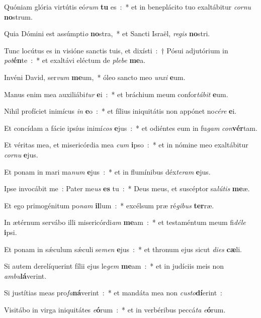 \item Quóniam glória virtútis eó\emph{rum} \textbf{tu} es~:~* et in beneplácito tuo exaltábitur \emph{cor}\emph{nu} \textbf{no}strum.
\item Quia Dómini est assúmpti\emph{o} \textbf{no}stra,~* et Sancti Israël, \emph{re}\emph{gis} \textbf{no}stri.
\item Tunc locútus es in visióne sanctis tuis, et dixísti~:~† Pósui adjutórium in \emph{pot}\textbf{én}te~:~* et exaltávi eléctum de \emph{ple}\emph{be} \textbf{me}a.
\item Invéni David, ser\emph{vum} \textbf{me}um,~* óleo sancto meo \emph{un}\emph{xi} \textbf{e}um.
\item Manus enim mea auxiliábi\emph{tur} \textbf{e}i~:~* et bráchium meum confor\emph{tá}\emph{bit} \textbf{e}um.
\item Nihil profíciet inimícus \emph{in} \textbf{e}o~:~* et fílius in\-i\-qui\-tá\-tis non appónet no\emph{cé}\emph{re} \textbf{e}i.
\item Et concídam a fácie ipsíus inimí\emph{cos} \textbf{e}jus~:~* et odiéntes eum in fu\emph{gam} \emph{con}\textbf{vér}tam.
\item Et véritas mea, et misericórdia mea \emph{cum} \textbf{i}pso~:~* et in nómine meo exaltábitur \emph{cor}\emph{nu} \textbf{e}jus.
\item Et ponam in mari ma\emph{num} \textbf{e}jus~:~* et in flumínibus déx\emph{te}\emph{ram} \textbf{e}jus.
\item Ipse invocábit me~: Pater me\emph{us} \textbf{es} tu~:~* Deus meus, et suscéptor sa\emph{lú}\emph{tis} \textbf{me}æ.
\item Et ego primogénitum po\emph{nam} \textbf{il}lum~:~* excélsum præ ré\emph{gi}\emph{bus} \textbf{ter}ræ.
\item In ætérnum servábo illi misericórdi\emph{am} \textbf{me}am~:~* et testaméntum meum fi\emph{dé}\emph{le} \textbf{i}psi.
\item Et ponam in sǽculum sǽculi se\emph{men} \textbf{e}jus~:~* et thronum ejus sicut \emph{di}\emph{es} \textbf{cæ}li.
\item Si autem derelíquerint fílii ejus le\emph{gem} \textbf{me}am~:~* et in judíciis meis non \emph{am}\emph{bu}\textbf{lá}verint.
\item Si justítias meas pro\emph{fa}\textbf{ná}verint~:~* et mandáta mea non \emph{cu}\emph{sto}\textbf{dí}erint~:
\item Visitábo in virga iniquitátes \emph{e}\textbf{ó}rum~:~* et in verbéribus peccá\emph{ta} \emph{e}\textbf{ó}rum.

